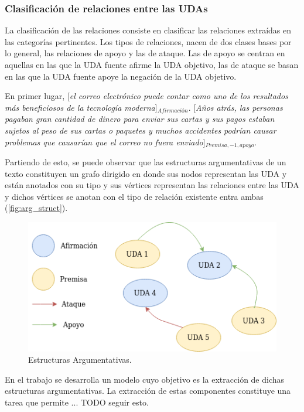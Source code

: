 \subsubsection{Clasificación de relaciones entre las UDAs}

La clasificación de las relaciones consiste en clasificar las relaciones extraídas en las categorías pertinentes.
Los tipos de relaciones, nacen de dos clases bases por lo general, las relaciones de apoyo y las de ataque.
Las de apoyo se centran en aquellas en las que la UDA fuente afirme la UDA objetivo, las de ataque se basan en 
las que la UDA fuente apoye la negación de la UDA objetivo.

\begin{adjustwidth}{25pt}{25pt}
    En primer lugar, [\emph{el correo electrónico puede contar como uno de los resultados
    más beneficiosos de la tecnología moderna}]$_{Afirmación}$. [\emph{Años atrás, las personas pagaban gran cantidad de dinero para 
    enviar sus cartas y sus pagos estaban sujetos al peso de sus cartas o paquetes y muchos accidentes podrían 
    causar problemas que causarían que el correo no fuera enviado}]$_{Premisa, -1, apoyo}$.
\end{adjustwidth}

Partiendo de esto, se puede observar que las estructuras argumentativas de un texto constituyen un grafo dirigido 
en donde sus nodos representan las UDA y están anotados con su tipo y sus vértices representan las 
relaciones entre las UDA y dichos vértices se anotan con el tipo de relación existente entra ambas (\ref{fig:arg_struct}).

\begin{figure}[h!]
	\begin{center}
		\begin{center}
			\includegraphics[scale=.7]{Graphics/Estructuras_argumentativas.png}
        \end{center}
	    \caption{Estructuras Argumentativas.}
	\end{center}
\end{figure}\label{fig:arg_struct}


En el trabajo se desarrolla un modelo cuyo objetivo es la extracción de dichas estructuras argumentativas. 
La extracción de estas componentes constituye una tarea que permite ... TODO seguir esto.
